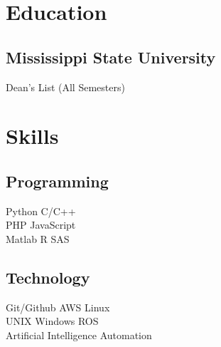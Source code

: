 \documentclass[]{deedy-resume-reversed}
\begin{document}
\begin{minipage}[t]{0.60\textwidth}

% 
% 

%
%

\end{minipage}
\hfill
\begin{minipage}[t]{0.33\textwidth}


\section{Education}

\subsection{Mississippi State University}
Dean's List (All Semesters) \\
\sectionsep


\section{Skills}
\subsection{Programming}
Python \textbullet{} C/C++ \\
PHP \textbullet{} JavaScript \\
Matlab \textbullet{} R \textbullet{} SAS \\
\sectionsep

\subsection{Technology}
Git/Github \textbullet{} AWS \textbullet{} Linux \\
UNIX \textbullet{} Windows \textbullet{} ROS \\
Artificial Intelligence \textbullet{} Automation \\
\sectionsep


\end{minipage}
\end{document}
